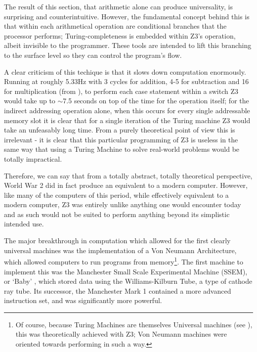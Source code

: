 \documentclass[Master.tex]{subfiles}
\begin{document}
The result of this section, that arithmetic alone can produce universality, is surprising and counterintuitive. However, the fundamental concept behind this is that within each arithmetical operation are conditional branches that the processor performs; Turing-completeness is embedded within Z3's operation, albeit invisible to the programmer. These tools are intended to lift this branching to the surface level so they can control the program's flow.

A clear criticism of this techique is that it slows down computation enormously. Running at roughly 5.33Hz with 3 cycles for addition, 4-5 for subtraction and 16 for multiplication (from \cite{rojas1997z3architecture}), to perform each case statement within a switch Z3 would take up to $\sim$7.5 seconds on top of the time for the operation itself; for the indirect addressing operation alone, when this occurs for every single addressable memory slot it is clear that for a single iteration of the Turing machine Z3 would take an unfeasably long time. From a purely theoretical point of view this is irrelevant - it is clear that this particular programming of Z3 is useless in the same way that using a Turing Machine to solve real-world problems would be totally impractical.

Therefore, we can say that from a totally abstract, totally theoretical perspective, World War 2 did in fact produce an equivalent to a modern computer. However, like many of the computers of this period, while effectively equivalent to a modern computer, Z3 was entirely unlike anything one would encounter today and as such would not be suited to perform anything beyond its simplistic intended use.

The major breakthrough in computation which allowed for the first clearly universal machines was the implementation of a Von Neumann Architecture, which allowed computers to run programs from memory\footnote{Of course, because Turing Machines are themselves Universal machines (see \cite{turing1936computablenumbers}), this was theoretically achieved with Z3; Von Neumann machines were oriented towards performing in such a way.}. The first machine to implement this was the Manchester Small Scale Experimental Machine (SSEM), or `Baby' \cite{napperWEB17baby}, which stored data using the Williams-Kilburn Tube, a type of cathode ray tube. Its successor, the Manchester Mark 1 contained a more advanced instruction set, and was significantly more powerful.
\end{document}
